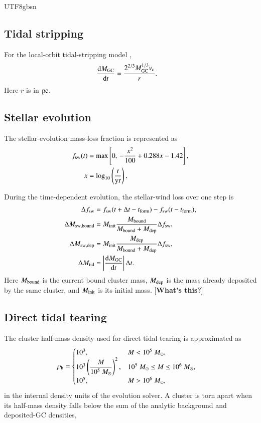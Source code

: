 \documentclass[trackchanges, twocolappendix, twocolumn]{aastex701}
\newcommand{\czkong}[1]{{\color{magenta}[\textbf{#1}]}}
\begin{document}
\begin{CJK*}{UTF8}{gbsn}
\subsection{Tidal stripping} \label{subsect:stripping}

For the local-orbit tidal-stripping model \citep{Fragione+2019GC},
\begin{align}
\dfrac{\mathrm{d} M_{\rm GC}}{\mathrm{d} t} & = \dfrac{2^{2/3} M_{\rm GC}^{1/3} v_{\rm c}}{r} .
\label{eq:tidal_stripping}
\end{align}
Here $r$ is in $\rm pc$.

\subsection{Stellar evolution} \label{subsect:stellar_evo}

The stellar-evolution mass-loss fraction is represented as \citep{Conroy&Gunn2010}
\begin{align}
f_{\rm sw}(t) &=
\max\left[0,\,-\dfrac{x^2}{100}+0.288x-1.42\right],\\
x &= \log_{10}\left(\dfrac{t}{\rm yr}\right),
\label{eq:stellar_evolution}
\end{align}

During the time-dependent evolution, the stellar-wind loss over one step is
\begin{align}
\Delta f_{\rm sw} &=
f_{\rm sw}(t+\Delta t-t_{\rm form})
-f_{\rm sw}(t-t_{\rm form}),\\
\Delta M_{\rm sw,bound} &=
M_{\rm init}\dfrac{M_{\rm bound}}
{M_{\rm bound}+M_{\rm dep}}\Delta f_{\rm sw},\\
\Delta M_{\rm sw,dep} &=
M_{\rm init}\dfrac{M_{\rm dep}}
{M_{\rm bound}+M_{\rm dep}}\Delta f_{\rm sw},\\
\Delta M_{\rm tid} &=
\left|\dfrac{\mathrm{d}M_{\rm GC}}{\mathrm{d}t}\right|\Delta t.
\end{align}
Here $M_{\rm bound}$ is the current bound cluster mass, $M_{\rm dep}$ is the mass already deposited by the same cluster, and $M_{\rm init}$ is its initial mass. \czkong{What's this?}

\subsection{Direct tidal tearing} \label{subsect:tearing}

The cluster half-mass density used for direct tidal tearing is approximated as
\begin{align}
\rho_{\rm h} & =
\begin{cases}
10^3, & M < 10^5~M_\odot,\\
10^3 \left(\dfrac{M}{10^5~M_\odot}\right)^2, & 10^5~M_\odot \le M \le 10^6~M_\odot,\\
10^5, & M > 10^6~M_\odot,
\end{cases}
\label{eq:cluster_density}
\end{align}
in the internal density units of the evolution solver. A cluster is torn apart when its half-mass density falls below the sum of the analytic background and deposited-GC densities,


\end{CJK*}
\end{document}
